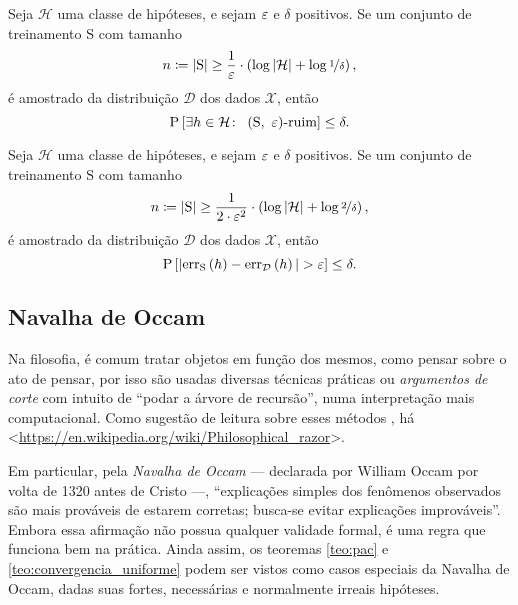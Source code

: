 \begin{teorema}
  \label{teo:pac}
  Seja $\mathcal{H}$ uma classe de hipóteses, e sejam $\varepsilon$ e $\delta$ positivos. Se um conjunto de treinamento $\mathrm{S}$ com tamanho
  \[
    n \coloneqq \left|\mathrm{S}\vphantom{1j}\right| \geq \frac{1}{\varepsilon}\cdot\left(\log\left|\mathcal{H}\vphantom{1j}\right| + \log\nicefrac{1}{\delta}\vphantom{1j}\right),
  \]
  é amostrado da distribuição $\mathcal{D}$ dos dados $\mathcal{X}$, então
  \[
    \mathrm{P}\left[\exists h\in\mathcal{H}\colon\ \left(\mathrm{S},\ \eps\vphantom{1j}\right)\!\text{-ruim}\vphantom{1j}\right] \leq \delta.
  \]
\end{teorema}

\begin{teorema}
  \label{teo:convergencia_uniforme}
  Seja $\mathcal{H}$ uma classe de hipóteses, e sejam $\varepsilon$ e $\delta$ positivos. Se um conjunto de treinamento $\mathrm{S}$ com tamanho
  \[
    n \coloneqq \left|\mathrm{S}\vphantom{1j}\right| \geq \frac{1}{2\cdot\varepsilon^2}\cdot\left(\log\left|\mathcal{H}\vphantom{1j}\right| + \log\nicefrac{2}{\delta}\vphantom{1j}\right),
  \]
  é amostrado da distribuição $\mathcal{D}$ dos dados $\mathcal{X}$, então
  \[
    \mathrm{P}\left[\left|\mathrm{err}_\mathrm{S}\left(h\vphantom{1j}\right)-\mathrm{err}_\mathcal{D}\left(h\vphantom{1j}\right)\vphantom{1j}\right| > \varepsilon\vphantom{1j}\right] \leq \delta.
  \]
\end{teorema}

\subsection{Navalha de Occam}

Na filosofia, é comum tratar objetos em função dos mesmos, como pensar sobre o ato de pensar, por isso são usadas diversas técnicas práticas ou \textit{argumentos de corte} com intuito de ``podar a árvore de recursão'', numa interpretação mais computacional. Como sugestão de leitura sobre esses métodos , há <\href{https://en.wikipedia.org/wiki/Philosophical\_razor}{https://en.wikipedia.org/wiki/Philosophical\_razor}>.

Em particular, pela \textit{Navalha de Occam} --- declarada por William Occam por volta de 1320 antes de Cristo ---, ``explicações simples dos fenômenos observados são mais prováveis de estarem corretas; busca-se evitar explicações improváveis''. Embora essa afirmação não possua qualquer validade formal, é uma regra que funciona bem na prática. Ainda assim, os teoremas \autoref{teo:pac} e \autoref{teo:convergencia_uniforme} podem ser vistos como casos especiais da Navalha de Occam, dadas suas fortes, necessárias e normalmente irreais hipóteses.

